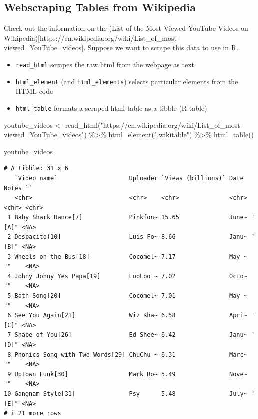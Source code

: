 \documentclass[
  letterpaper,
  DIV=11,
  numbers=noendperiod]{scrartcl}
\newenvironment{Shaded}{\begin{snugshade}}{\end{snugshade}}
\newcommand{\FunctionTok}[1]{\textcolor[rgb]{0.28,0.35,0.67}{#1}}
\newcommand{\NormalTok}[1]{\textcolor[rgb]{0.00,0.23,0.31}{#1}}
\newcommand{\OtherTok}[1]{\textcolor[rgb]{0.00,0.23,0.31}{#1}}
\newcommand{\SpecialCharTok}[1]{\textcolor[rgb]{0.37,0.37,0.37}{#1}}
\newcommand{\StringTok}[1]{\textcolor[rgb]{0.13,0.47,0.30}{#1}}
\providecommand{\tightlist}{%
  \setlength{\itemsep}{0pt}\setlength{\parskip}{0pt}}\usepackage{longtable,booktabs,array}
\begin{document}
\hypertarget{webscraping-tables-from-wikipedia}{%
\subsection{Webscraping Tables from
Wikipedia}\label{webscraping-tables-from-wikipedia}}

Check out the information on the (List of the Most Viewed YouTube Videos
on
Wikipedia){[}https://en.wikipedia.org/wiki/List\_of\_most-viewed\_YouTube\_videos{]}.
Suppose we want to scrape this data to use in R.

\begin{itemize}
\tightlist
\item
  \texttt{read\_html} scrapes the raw html from the webpage as text
\item
  \texttt{html\_element} (and \texttt{html\_elements}) selects
  particular elements from the HTML code
\item
  \texttt{html\_table} formats a scraped html table as a tibble (R
  table)
\end{itemize}

\begin{Shaded}
\begin{Highlighting}[]
\NormalTok{youtube\_videos }\OtherTok{\textless{}{-}} \FunctionTok{read\_html}\NormalTok{(}\StringTok{"https://en.wikipedia.org/wiki/List\_of\_most{-}viewed\_YouTube\_videos"}\NormalTok{) }\SpecialCharTok{\%\textgreater{}\%}
  \FunctionTok{html\_element}\NormalTok{(}\StringTok{".wikitable"}\NormalTok{) }\SpecialCharTok{\%\textgreater{}\%}
  \FunctionTok{html\_table}\NormalTok{() }

\NormalTok{youtube\_videos}
\end{Highlighting}
\end{Shaded}

\begin{verbatim}
# A tibble: 31 x 6
   `Video name`                    Uploader `Views (billions)` Date  Notes ``   
   <chr>                           <chr>    <chr>              <chr> <chr> <chr>
 1 Baby Shark Dance[7]             Pinkfon~ 15.65              June~ "[A]" <NA> 
 2 Despacito[10]                   Luis Fo~ 8.66               Janu~ "[B]" <NA> 
 3 Wheels on the Bus[18]           Cocomel~ 7.17               May ~ ""    <NA> 
 4 Johny Johny Yes Papa[19]        LooLoo ~ 7.02               Octo~ ""    <NA> 
 5 Bath Song[20]                   Cocomel~ 7.01               May ~ ""    <NA> 
 6 See You Again[21]               Wiz Kha~ 6.58               Apri~ "[C]" <NA> 
 7 Shape of You[26]                Ed Shee~ 6.42               Janu~ "[D]" <NA> 
 8 Phonics Song with Two Words[29] ChuChu ~ 6.31               Marc~ ""    <NA> 
 9 Uptown Funk[30]                 Mark Ro~ 5.49               Nove~ ""    <NA> 
10 Gangnam Style[31]               Psy      5.48               July~ "[E]" <NA> 
# i 21 more rows
\end{verbatim}
\end{document}
